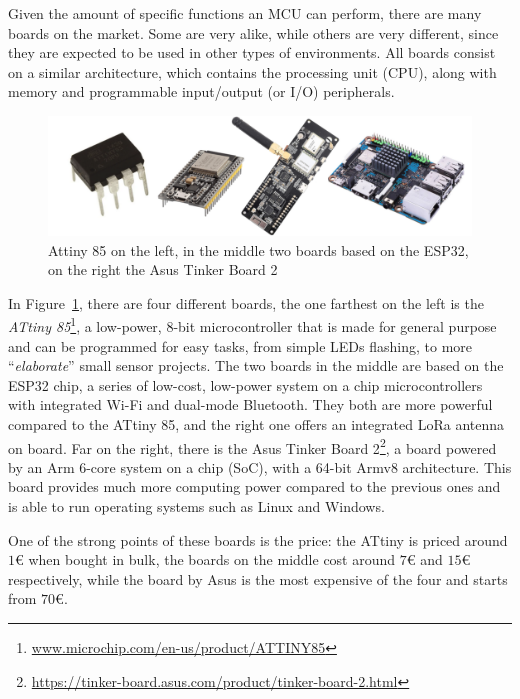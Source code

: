 		Given the amount of specific functions an MCU can perform, there are many boards on the market.
		Some are very alike, while others are very different, since they are expected to be used in other types of environments.
		All boards consist on a similar architecture, which contains the processing unit (CPU), along with memory and programmable input/output (or I/O) peripherals.
		
		\begin{figure}[H]
			\centering
			\includegraphics[width=\textwidth]{resources/img/chap3/generic_board}
			\caption{Attiny 85 on the left, in the middle two boards based on the ESP32, on the right the Asus Tinker Board 2}
			\label{img:generic_board}
		\end{figure}
	
		In Figure~\ref{img:generic_board}, there are four different boards, the one farthest on the left is the \textit{ATtiny 85}\footnote{ \url{www.microchip.com/en-us/product/ATTINY85}}, a low-power, 8-bit microcontroller that is made for general purpose and can be programmed for easy tasks, from simple LEDs flashing, to more ``\textit{elaborate}'' small sensor projects.
		The two boards in the middle are based on the ESP32 chip, a series of low-cost, low-power system on a chip microcontrollers with integrated Wi-Fi and dual-mode Bluetooth.
		They both are more powerful compared to the ATtiny 85, and the right one offers an integrated LoRa antenna on board.
		Far on the right, there is the Asus Tinker Board 2\footnote{ \url{https://tinker-board.asus.com/product/tinker-board-2.html}}, a board powered by an Arm 6-core system on a chip (SoC), with a 64-bit Armv8 architecture.
		This board provides much more computing power compared to the previous ones and is able to run operating systems such as Linux and Windows.
		
		One of the strong points of these boards is the price: the ATtiny is priced around $1$€ when bought in bulk, the boards on the middle cost around $7$€ and $15$€ respectively, while the board by Asus is the most expensive of the four and starts from $70$€.
		
